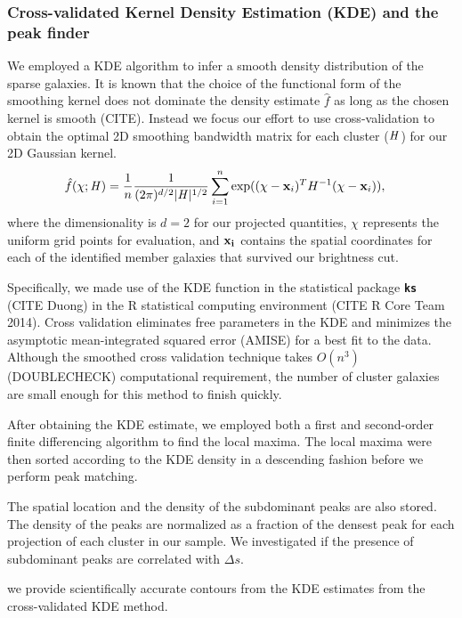 \subsubsection{Cross-validated Kernel Density Estimation (KDE) and the peak finder} 
\label{subsubsec:KDE}
We employed a KDE algorithm to infer a smooth density distribution of the
sparse galaxies.
It is known that the choice of the functional form of the smoothing kernel does
not dominate the density estimate $\hat{f}$ as long as the chosen kernel is
smooth (CITE). Instead we focus our effort to use cross-validation to obtain 
the optimal 2D smoothing
bandwidth matrix for each cluster ($\mathbf{\it H}$) for our 2D Gaussian kernel. 
\begin{align}
	\hat{f}(\chi; \mathbf{\it H}) &= \frac{1}{n} \frac{1}{(2\pi)^{d/2}|\mathbf{\it H}|^{1/2}}
	\sum_{i=1}^n \exp((\chi-{\bf x}_i)^T H^{-1} (\chi-{\bf x}_i)),
\end{align}
where the dimensionality is $d=2$ for our projected quantities,
$\chi$ represents the uniform grid points for evaluation, and 
$\bf{x}_i$ contains the spatial coordinates for each of the identified member 
galaxies that survived our brightness cut.

Specifically, we made use of the KDE function in
the statistical package {\bf \texttt{ks}} (CITE Duong) in the R statistical 
computing environment (CITE R Core Team 2014). 
Cross validation eliminates free parameters in the KDE and minimizes
the asymptotic mean-integrated squared error (AMISE) for a best fit to the
data. Although the smoothed cross validation technique takes $O(n^3)$
(DOUBLECHECK) computational requirement, the number of cluster galaxies are
small enough for this method to finish quickly. 

After obtaining the KDE estimate, we employed both a first and second-order  
finite differencing algorithm to find the local maxima.  
The local maxima were then sorted according to the KDE density in a descending
fashion before we perform peak matching. 

The spatial location and the density of the subdominant peaks are also stored.
The density
of the peaks are normalized as a fraction of the densest peak for each
projection of each cluster in our sample. 
We investigated if the presence of subdominant peaks are correlated with
$\Delta s$. 

 we provide scientifically accurate contours from the KDE 
estimates from the cross-validated KDE method. 


